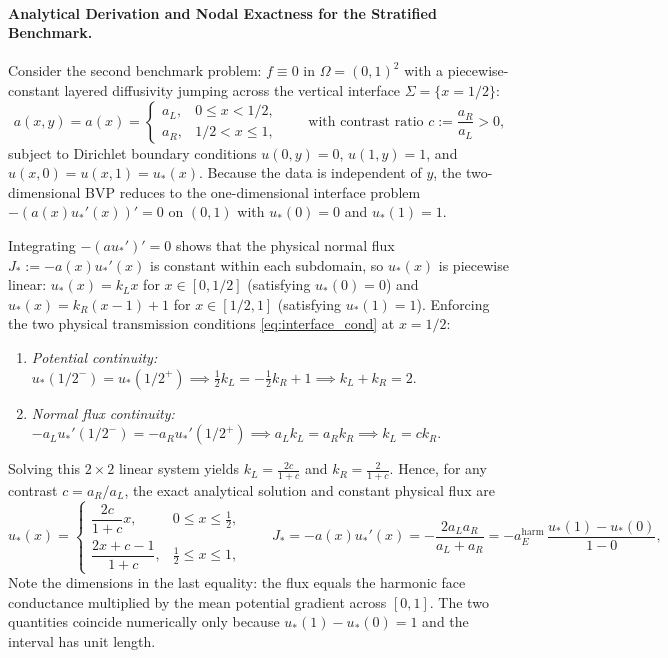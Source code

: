 \documentclass[11pt,a4paper]{article}
\theoremstyle{definition}
\theoremstyle{remark}
\begin{document}
\paragraph{Analytical Derivation and Nodal Exactness for the Stratified Benchmark.}
Consider the second benchmark problem: $f \equiv 0$ in $\Omega = (0,1)^2$ with a piecewise-constant layered diffusivity jumping across the vertical interface $\Sigma = \{x = 1/2\}$:
\begin{equation}
    a(x,y) = a(x) = \begin{cases} a_L, & 0 \le x < 1/2, \\ a_R, & 1/2 < x \le 1, \end{cases}
    \qquad \text{with contrast ratio } c := \frac{a_R}{a_L} > 0,
    \label{eq:layered_a}
\end{equation}
subject to Dirichlet boundary conditions $u(0,y) = 0$, $u(1,y) = 1$, and $u(x,0) = u(x,1) = u_*(x)$. Because the data is independent of $y$, the two-dimensional BVP reduces to the one-dimensional interface problem $-(a(x)u_*'(x))' = 0$ on $(0,1)$ with $u_*(0) = 0$ and $u_*(1) = 1$.

Integrating $-(au_*')' = 0$ shows that the physical normal flux $J_* := -a(x)u_*'(x)$ is constant within each subdomain, so $u_*(x)$ is piecewise linear: $u_*(x) = k_L x$ for $x \in [0, 1/2]$ (satisfying $u_*(0)=0$) and $u_*(x) = k_R(x-1) + 1$ for $x \in [1/2, 1]$ (satisfying $u_*(1)=1$). Enforcing the two physical transmission conditions \eqref{eq:interface_cond} at $x = 1/2$:
\begin{enumerate}[label=(\arabic*), leftmargin=2em, itemsep=2pt]
    \item \emph{Potential continuity:} $u_*(1/2^-) = u_*(1/2^+) \implies \frac{1}{2}k_L = -\frac{1}{2}k_R + 1 \implies k_L + k_R = 2$.
    \item \emph{Normal flux continuity:} $-a_L u_*'(1/2^-) = -a_R u_*'(1/2^+) \implies a_L k_L = a_R k_R \implies k_L = c k_R$.
\end{enumerate}
Solving this $2 \times 2$ linear system yields $k_L = \frac{2c}{1+c}$ and $k_R = \frac{2}{1+c}$. Hence, for any contrast $c = a_R/a_L$, the exact analytical solution and constant physical flux are
\begin{equation}
    u_*(x) = \begin{cases}
        \dfrac{2c}{1+c}x, & 0 \le x \le \tfrac{1}{2}, \\[3mm]
        \dfrac{2x + c - 1}{1+c}, & \tfrac{1}{2} \le x \le 1,
    \end{cases}
    \qquad
    J_* = -a(x)u_*'(x) = -\frac{2a_L a_R}{a_L + a_R} = -a_E^{\text{harm}}\,\frac{u_*(1)-u_*(0)}{1-0},
    \label{eq:layered_exact_general}
\end{equation}
Note the dimensions in the last equality: the flux equals the harmonic face conductance multiplied by the mean potential gradient across $[0,1]$. The two quantities coincide numerically only because $u_*(1)-u_*(0)=1$ and the interval has unit length.
\end{document}
